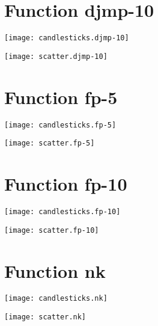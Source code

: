 \section{Function djmp-10}
\begin{center}

\end{center}
\begin{center}

\end{center}
\begin{center}
\texttt{[image: candlesticks.djmp-10]}
\end{center}
\begin{center}
\texttt{[image: scatter.djmp-10]}
\end{center}
\newpage
\section{Function fp-5}
\begin{center}

\end{center}
\begin{center}

\end{center}
\begin{center}
\texttt{[image: candlesticks.fp-5]}
\end{center}
\begin{center}
\texttt{[image: scatter.fp-5]}
\end{center}
\newpage
\section{Function fp-10}
\begin{center}

\end{center}
\begin{center}

\end{center}
\begin{center}
\texttt{[image: candlesticks.fp-10]}
\end{center}
\begin{center}
\texttt{[image: scatter.fp-10]}
\end{center}
\newpage
\section{Function nk}
\begin{center}

\end{center}
\begin{center}

\end{center}
\begin{center}
\texttt{[image: candlesticks.nk]}
\end{center}
\begin{center}
\texttt{[image: scatter.nk]}
\end{center}
\newpage
